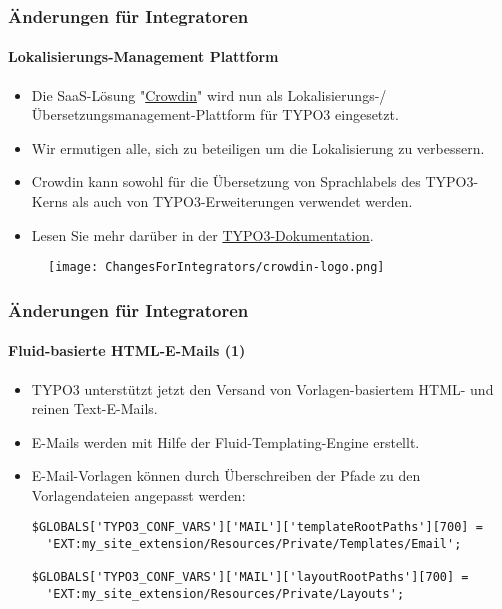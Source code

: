 
\begin{frame}[fragile]
	\frametitle{Änderungen für Integratoren}
	\framesubtitle{Lokalisierungs-Management Plattform}

	\begin{itemize}
		\item Die SaaS-Lösung "\href{https://crowdin.com/}{Crowdin}" wird nun als
			Lokalisierungs-/Übersetzungsmanagement-Plattform für TYPO3 eingesetzt.
		\item Wir ermutigen alle, sich zu beteiligen um die Lokalisierung zu verbessern.
		\item Crowdin kann sowohl für die Übersetzung von Sprachlabels des TYPO3-Kerns als
			auch von TYPO3-Erweiterungen verwendet werden.
		\item Lesen Sie mehr darüber in der
			\href{https://docs.typo3.org/m/typo3/reference-coreapi/master/en-us/ApiOverview/Internationalization/TranslationServer/Crowdin.html}{TYPO3-Dokumentation}.
	\end{itemize}

	\begin{figure}
		\texttt{[image: ChangesForIntegrators/crowdin-logo.png]}
	\end{figure}

\end{frame}


\begin{frame}[fragile]
	\frametitle{Änderungen für Integratoren}
	\framesubtitle{Fluid-basierte HTML-E-Mails (1)}

	\lstset{basicstyle=\smaller\ttfamily}

	\begin{itemize}
		\item TYPO3 unterstützt jetzt den Versand von Vorlagen-basiertem HTML- und reinen Text-E-Mails.
		\item E-Mails werden mit Hilfe der Fluid-Templating-Engine erstellt.
		\item E-Mail-Vorlagen können durch Überschreiben der Pfade zu den Vorlagendateien angepasst werden:         

\vspace{-0.2cm}
\begin{lstlisting}
$GLOBALS['TYPO3_CONF_VARS']['MAIL']['templateRootPaths'][700] =
  'EXT:my_site_extension/Resources/Private/Templates/Email';

$GLOBALS['TYPO3_CONF_VARS']['MAIL']['layoutRootPaths'][700] =
  'EXT:my_site_extension/Resources/Private/Layouts';
\end{lstlisting}

	\end{itemize}

\end{frame}

